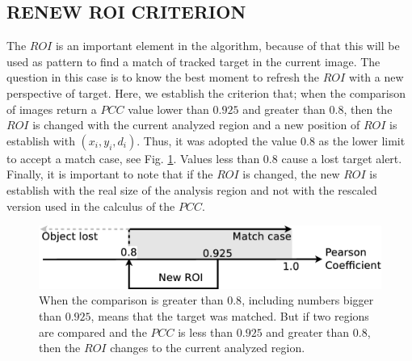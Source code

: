\subsection{RENEW ROI CRITERION}
The $ROI$ is an important element in the algorithm, because of that this  
will be used as pattern to find a match of tracked target in the current image. 
The  question in this case is to know the best moment to refresh the $ROI$
with a new perspective of target. 
Here, we establish the criterion that; when the comparison of images return 
a $PCC$ value lower than $0.925$ and greater than $0.8$, then the $ROI$ is changed with the current 
analyzed region and a new position of $ROI$ is establish with $(x_i,y_i,d_i)$. 
Thus, it was adopted the value $0.8$ as the lower limit to accept a match case\cite{Eugene},
see Fig. \ref{fig:newroicri}. Values less than $0.8$ cause a  lost target alert.
Finally, it is important to note that if the $ROI$ is changed, the new $ROI$ is establish
with the real size of the analysis region and not with the rescaled version used
in the calculus of the $PCC$.


\begin{figure}[H]
\includegraphics[width=\columnwidth]{images/figure3.eps}
\caption{When the comparison is greater than $0.8$, including numbers bigger than 
$0.925$, means that the target was matched. But if two regions are compared 
and the $PCC$ is less than $0.925$ and greater than $0.8$, 
then the $ROI$ changes to the current analyzed region.}
\label{fig:newroicri}
\end{figure}

